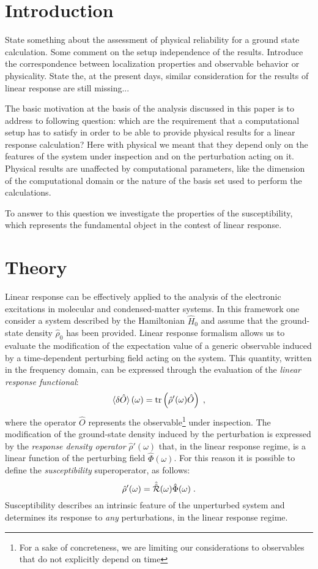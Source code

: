 \documentclass[reprint,aps,prb]{revtex4-1}
\newcommand{\be}{\begin{equation}}
\newcommand{\ee}{\end{equation}}
\newcommand{\lb}{\label}
\newcommand{\op}[1]{\hat {#1}}
\newcommand{\sop}[1]{\op{\op {#1}}}
\newcommand{\trace}[1]{\mathrm{tr}\left(#1\right)}
\newcommand{\dmnot}{\op{\rho}_0}
\newcommand{\dm}{\op{\rho}}
\newcommand{\hnot}{\op{H}_0}
\begin{document}
\section{Introduction}

State something about the assessment of physical reliability for a ground state calculation. Some comment on the setup independence of the results. Introduce the correspondence
between localization properties and observable behavior or physicality. State the, at the present days, similar consideration for the results of linear response are still 
missing...

The basic motivation at the basis of the analysis discussed in this paper is to address to following question: which are the requirement that a computational setup has to
satisfy in order to be able to provide physical results for a linear response calculation? Here with physical we meant that they depend only on the features of the system under
inspection and on the perturbation acting on it. Physical results are unaffected by computational parameters, like the dimension of the computational domain or the nature of
the basis set used to perform the calculations. 

To answer to this question we investigate the properties of the susceptibility, which represents the fundamental object in the contest of linear response. 


\section{Theory}

Linear response can be effectively applied to the analysis of the electronic excitations in molecular and condensed-matter systems. In this framework one consider a system 
described by the Hamiltonian $\hnot$ and assume that the ground-state density $\dmnot$ has been provided. Linear response formalism allows us to evaluate the modification 
of the expectation value of a generic observable induced by a time-dependent perturbing field acting on the system. This quantity, written in the frequency domain, can be expressed 
through the evaluation of the \emph{linear response functional}:
\be\lb{LinearResponseFunctDef1}
\braket{\delta\op O}(\omega) = \trace{\dm'(\omega)\op O} \;,
\ee
where the operator $\op O$ represents the observable\footnote{For a sake of concreteness, we are limiting our considerations to observables that do not explicitly depend on time} 
under inspection. The modification of the ground-state density induced by the perturbation is expressed by the \emph{response density operator} $\dm'(\omega)$ that, in the linear 
response regime, is a linear function of the perturbing field $\op\Phi(\omega)$. For this reason it is possible to define the \emph{susceptibility} superoperator, as follows:
\be\lb{SusceptibilityDef1}
\dm'(\omega) = \sop{{\cal R}}(\omega) \op\Phi(\omega) \;. 
\ee
Susceptibility describes an intrinsic feature of the unperturbed system and determines its response to \emph{any} perturbations, in the linear response regime.
\end{document}
